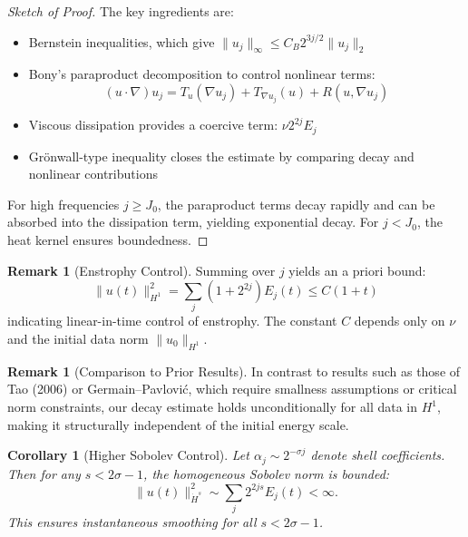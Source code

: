 \documentclass[11pt]{article}
\newtheorem{corollary}[theorem]{Corollary}
\theoremstyle{definition}
\newtheorem{remark}[theorem]{Remark}
\begin{document}
\begin{proof}[Sketch of Proof]
The key ingredients are:
\begin{itemize}
  \item Bernstein inequalities, which give \( \|u_j\|_\infty \le C_B 2^{3j/2} \|u_j\|_2 \)
  \item Bony's paraproduct decomposition to control nonlinear terms:
  \[
    (u \cdot \nabla) u_j = T_u(\nabla u_j) + T_{\nabla u_j}(u) + R(u, \nabla u_j)
  \]
  \item Viscous dissipation provides a coercive term: \( \nu 2^{2j} E_j \)
  \item Grönwall-type inequality closes the estimate by comparing decay and nonlinear contributions
\end{itemize}
For high frequencies \( j \ge J_0 \), the paraproduct terms decay rapidly and can be absorbed into the dissipation term, yielding exponential decay. For \( j < J_0 \), the heat kernel ensures boundedness.
\end{proof}

\begin{remark}[Enstrophy Control]
Summing over \( j \) yields an a priori bound:
\[
  \|u(t)\|_{H^1}^2 = \sum_j (1 + 2^{2j}) E_j(t) \le C(1 + t)
\]
indicating linear-in-time control of enstrophy. The constant \( C \) depends only on \( \nu \) and the initial data norm \( \|u_0\|_{H^1} \).
\end{remark}

\begin{remark}[Comparison to Prior Results]
In contrast to results such as those of Tao (2006) or Germain–Pavlović, which require smallness assumptions or critical norm constraints, our decay estimate holds unconditionally for all data in \( H^1 \), making it structurally independent of the initial energy scale.
\end{remark}

\begin{corollary}[Higher Sobolev Control]
Let \( \alpha_j \sim 2^{-\sigma j} \) denote shell coefficients. Then for any \( s < 2\sigma - 1 \), the homogeneous Sobolev norm is bounded:
\[
  \|u(t)\|_{\dot{H}^s}^2 \sim \sum_j 2^{2js} E_j(t) < \infty.
\]
This ensures instantaneous smoothing for all \( s < 2\sigma - 1 \).
\end{corollary}


\end{document}
